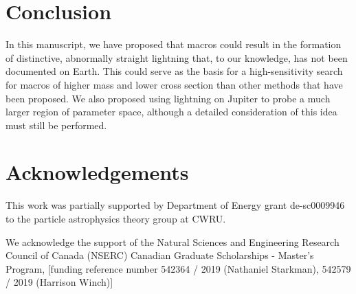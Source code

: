 \documentclass[%
 reprint,
 amsmath,amssymb,
 aps,
]{revtex4-2}
\begin{document}


\medskip
\section{Conclusion} %
\label{sec:conclusion}

    In this manuscript, we have proposed that macros could result in the formation of distinctive, abnormally straight lightning that, to our knowledge, has not been documented on Earth. This could serve as the basis for a high-sensitivity search for macros of higher mass and lower cross section than other methods that have been proposed. We also proposed using lightning on Jupiter to probe a much larger region of parameter space, although a detailed consideration of this idea must still be performed.



\section{Acknowledgements} %
\label{sec:acknowledgements}

    This work was partially supported by Department of Energy grant de-sc0009946 to the particle astrophysics theory group at CWRU.

    We acknowledge the support of the Natural Sciences and Engineering Research Council of Canada (NSERC) Canadian Graduate Scholarships - Master's Program, [funding reference number 542364 / 2019 (Nathaniel Starkman), 542579 / 2019 (Harrison Winch)]






\end{document}
